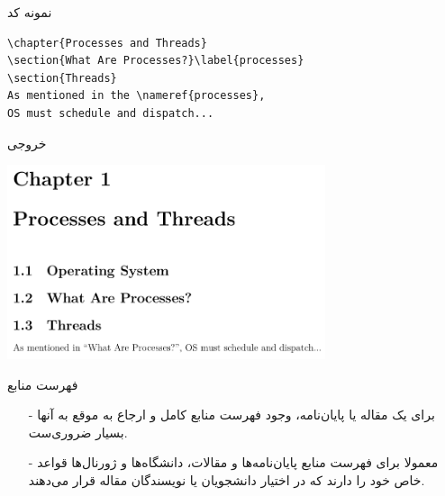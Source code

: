 \begin{frame}[fragile]{نمونه کد}
\begin{latin}
\begin{lstlisting}[keywords={chapter, section, label, ref}, keywordstyle=\color{Mulberry}\textbf]
\chapter{Processes and Threads}
\section{What Are Processes?}\label{processes}
\section{Threads}
As mentioned in the \nameref{processes},
OS must schedule and dispatch...
\end{lstlisting}
\end{latin}
\end{frame}

\begin{frame}{خروجی}
\begin{center}
\includegraphics[width=0.7\textwidth, height=0.75\textheight]{docs/images/proc-nameref-change}
\end{center}
\end{frame}

\begin{frame}{فهرست منابع}
\begin{itemize}\itemr
\item[-]
برای یک مقاله یا پایان‌نامه، وجود فهرست منابع کامل و ارجاع به موقع به آنها بسیار ضروری‌ست.

\item[-]
معمولا برای فهرست منابع پایان‌نامه‌ها و مقالات، دانشگاه‌ها و ژورنال‌ها قواعد خاص خود را دارند که در اختیار دانشجویان یا نویسندگان مقاله قرار می‌دهند.
\end{itemize}
\end{frame}

